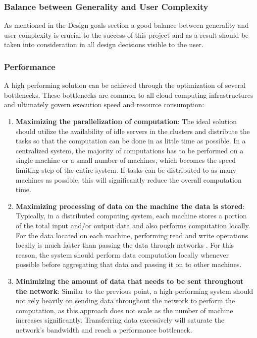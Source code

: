 \documentclass[a4paper]{article}
\begin{document}
\subsubsection{Balance between Generality and User Complexity}
As mentioned in the Design goals section a good balance between generality and user complexity is crucial to the success of this project and as a result should be taken into consideration in all design decisions visible to the user.  

\subsubsection{Performance}
A high performing solution can be achieved through the optimization of several bottlenecks.  These bottlenecks are common to all cloud computing infrastructures and ultimately govern execution speed and resource consumption:

\begin{enumerate}
  \item \textbf{Maximizing the parallelization of computation}: The ideal solution should utilize the availability of idle servers in the clusters and distribute the tasks so that the computation can be done in as little time as possible. In a centralized system, the majority of computations has to be performed on a single machine or a small number of machines, which becomes the speed limiting step of the entire system. If tasks can be distributed to as many machines as possible, this will significantly reduce the overall computation time.
  
  \item \textbf{Maximizing processing of data on the machine the data is stored}: Typically, in a distributed computing system, each machine stores a portion of the total input and/or output data and also performs computation locally. For the data located on each machine, performing read and write operations locally is much faster than passing the data through networks \cite{Cloud Computing Disadvantage}. For this reason, the system should perform data computation locally whenever possible before aggregating that data and passing it on to other machines. 
   
  \item \textbf{Minimizing the amount of data that needs to be sent throughout the network}: Similar to the previous point, a high performing system should not rely heavily on sending data throughout the network to perform the computation, as this approach does not scale as the number of machine increases significantly\cite{Cloud Computing Network Bottleneck}. Transferring data excessively will saturate the network's bandwidth and reach a performance bottleneck.
\end{enumerate}
\end{document}
